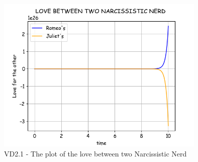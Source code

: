 \pagebreak
\begin{figure}[!htbp]
    \centering
    \includegraphics[width=100mm]{image/bt2/plot2.1.png}
    \caption{VD2.1 - The plot of the love between two Narcissistic Nerd }
\end{figure}

